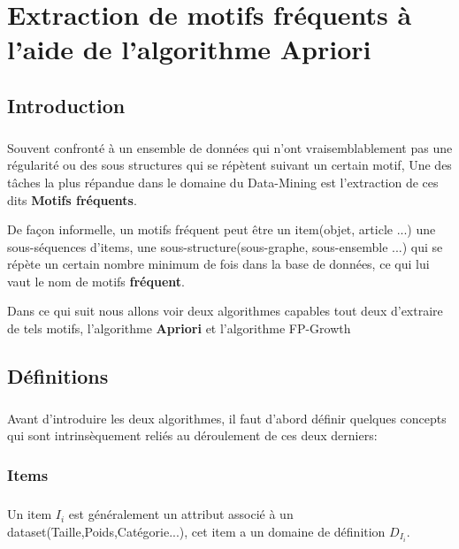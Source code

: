 \chapter{Extraction de motifs fréquents à l'aide de l'algorithme Apriori}\label{apriori}
	\section{Introduction}
		\paragraph{}
		Souvent confronté à un ensemble de données qui n'ont vraisemblablement pas une régularité ou des sous structures qui se répètent suivant un certain motif, Une des tâches la plus répandue dans le domaine du Data-Mining est l'extraction de ces dits \textbf{Motifs fréquents}.
		\par 
		De façon informelle, un motifs fréquent peut être un item(objet, article ...) une sous-séquences d'items, une sous-structure(sous-graphe, sous-ensemble ...) qui se répète un certain nombre minimum de fois dans la base de données, ce qui lui vaut le nom de motifs \textbf{fréquent}\cite{Han}.
		\par 
		Dans ce qui suit nous allons voir deux algorithmes capables tout deux d'extraire de tels motifs, l'algorithme \textbf{Apriori} \cite{Agrawal:1994:FAM:645920.672836} et l'algorithme FP-Growth \cite{Hanfp}
		
	\section{Définitions}
		\paragraph{}
		Avant d'introduire les deux algorithmes, il faut d'abord définir quelques concepts qui sont intrinsèquement reliés au déroulement de ces deux derniers:
		\subsection*{Items}
			\paragraph{}
			Un item $I_i$ est généralement un attribut associé à un dataset(Taille,Poids,Catégorie...), cet item a un domaine de définition $D_{I_i}$.
		
